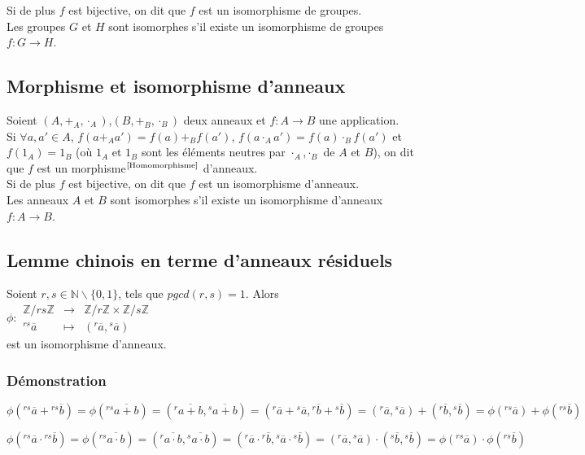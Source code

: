 \documentclass[a4paper,10pt]{book} %
\newcommand{\N}{\mathbb{N}}
\newcommand{\Z}{\mathbb{Z}}
\begin{document}
Si de plus $f$ est bijective, on dit que $f$ est un isomorphisme de groupes.\\
Les groupes $G$ et $H$ sont isomorphes s'il existe un isomorphisme de groupes $f:G\rightarrow H$.

\subsection{Morphisme et isomorphisme d'anneaux}
Soient $(A,+_A,\cdot_A)$,$(B,+_B,\cdot_B)$ deux anneaux et $f:A\rightarrow B$ une application.\\
Si $\forall a,a'\in A$, $f(a+_Aa')=f(a)+_Bf(a')$, $f(a\cdot_A a')=f(a)\cdot_B f(a')$ et $f(1_A)=1_B$ (où $1_A$ et $1_B$ sont les éléments neutres par $\cdot_A$,$\cdot_B$ de $A$ et $B$), on dit que $f$ est un morphisme$^\text{\ref{Homomorphisme}}$ d'anneaux.\\

Si de plus $f$ est bijective, on dit que $f$ est un isomorphisme d'anneaux.\\
Les anneaux $A$ et $B$ sont isomorphes s'il existe un isomorphisme d'anneaux $f : A\rightarrow B$.

\subsection{Lemme chinois en terme d'anneaux résiduels}
Soient $r,s\in \N\backslash\{0,1\}$, tels que $pgcd(r,s)=1$. Alors $\phi :\begin{array}{rcl}\Z/rs\Z &\rightarrow &\Z/r\Z\times \Z/s\Z \\ {}^{rs}\overline{a}&\mapsto &({}^r\overline{a},{}^s\overline{a})\end{array}$\\
est un isomorphisme d'anneaux.

\subsubsection{Démonstration}\small
$\phi({}^{rs}\overline{a}+{}^{rs}\overline{b})=\phi({}^{rs}\overline{a+b})=({}^{r}\overline{a+b},{}^{s}\overline{a+b})= ({}^{r}\overline{a}+{}^{s}\overline{a},{}^{r}\overline{b}+{}^{s}\overline{b}) =({}^{r}\overline{a},{}^{s}\overline{a})+({}^{r}\overline{b},{}^{s}\overline{b})=\phi({}^{rs}\overline{a})+\phi({}^{rs}\overline{b})$
\normalsize

$\phi({}^{rs}\overline{a}\cdot {}^{rs}\overline{b})=\phi({}^{rs}\overline{a\cdot b})=({}^{r}\overline{a\cdot b},{}^{s}\overline{a\cdot b})= ({}^{r}\overline{a}\cdot {}^{r}\overline{b},{}^{s}\overline{a}\cdot {}^{s}\overline{b})= ({}^{r}\overline{a},{}^{s}\overline{a})\cdot ({}^{s}\overline{b},{}^{s}\overline{b})=\phi({}^{rs}\overline{a})\cdot \phi({}^{rs}\overline{b})$
\end{document}
